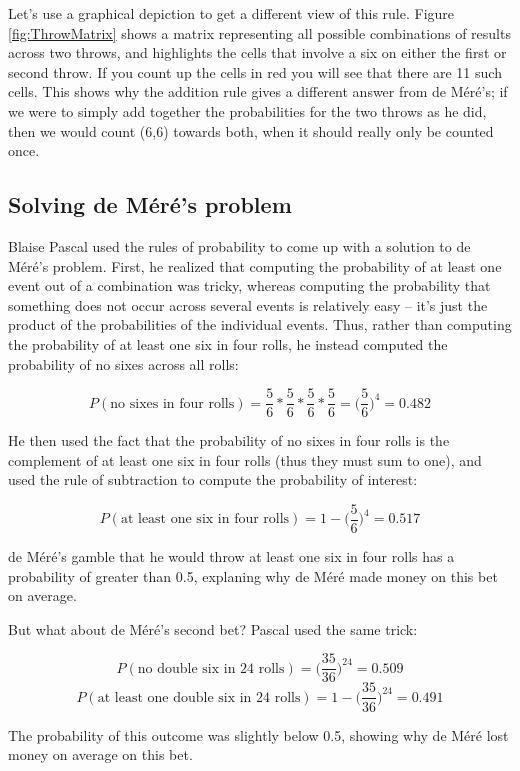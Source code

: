 \documentclass[
  12pt,
]{book}
\begin{document}
Let's use a graphical depiction to get a different view of this rule. Figure \ref{fig:ThrowMatrix} shows a matrix representing all possible combinations of results across two throws, and highlights the cells that involve a six on either the first or second throw. If you count up the cells in red you will see that there are 11 such cells. This shows why the addition rule gives a different answer from de Méré's; if we were to simply add together the probabilities for the two throws as he did, then we would count (6,6) towards both, when it should really only be counted once.

\hypertarget{solving-de-muxe9ruxe9s-problem}{%
\subsection{Solving de Méré's problem}\label{solving-de-muxe9ruxe9s-problem}}

Blaise Pascal used the rules of probability to come up with a solution to de Méré's problem. First, he realized that computing the probability of at least one event out of a combination was tricky, whereas computing the probability that something does not occur across several events is relatively easy -- it's just the product of the probabilities of the individual events. Thus, rather than computing the probability of at least one six in four rolls, he instead computed the probability of no sixes across all rolls:

\[
P(\text{no sixes in four rolls}) = \frac{5}{6}*\frac{5}{6}*\frac{5}{6}*\frac{5}{6}=\bigg(\frac{5}{6}\bigg)^4=0.482
\]

He then used the fact that the probability of no sixes in four rolls is the complement of at least one six in four rolls (thus they must sum to one), and used the rule of subtraction to compute the probability of interest:

\[
P(\text{at least one six in four rolls}) = 1 - \bigg(\frac{5}{6}\bigg)^4=0.517
\]

de Méré's gamble that he would throw at least one six in four rolls has a probability of greater than 0.5, explaning why de Méré made money on this bet on average.

But what about de Méré's second bet? Pascal used the same trick:

\[
P(\text{no double six in 24 rolls}) = \bigg(\frac{35}{36}\bigg)^{24}=0.509
\]
\[
P(\text{at least one double six in 24 rolls}) = 1 - \bigg(\frac{35}{36}\bigg)^{24}=0.491
\]

The probability of this outcome was slightly below 0.5, showing why de Méré lost money on average on this bet.
\end{document}
